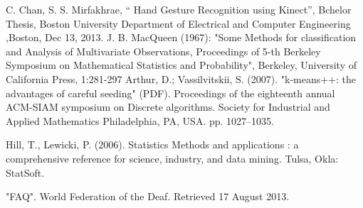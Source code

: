 \documentclass[12pt]{report}           %
\begin{document}
\begin{thebibliography}{80}
C. Chan, S. S. Mirfakhrae, “ Hand Gesture Recognition using
Kinect”, Bchelor Thesis, Boston University Department of
Electrical and Computer Engineering ,Boston, Dec 13, 2013.
J. B. MacQueen (1967): "Some Methods for classification and Analysis of Multivariate Observations, Proceedings of 5-th Berkeley Symposium on Mathematical Statistics and Probability", Berkeley, University of California Press, 1:281-297
Arthur, D.; Vassilvitskii, S. (2007). "k-means++: the advantages of careful seeding" (PDF). Proceedings of the eighteenth annual ACM-SIAM symposium on Discrete algorithms. Society for Industrial and Applied Mathematics Philadelphia, PA, USA. pp. 1027–1035.

Hill, T.,  Lewicki, P. (2006). Statistics Methods and applications : a comprehensive reference for science, industry, and data mining. Tulsa, Okla: StatSoft.

 "FAQ". World Federation of the Deaf. Retrieved 17 August 2013.
 
 
\end{thebibliography}
\end{document}
